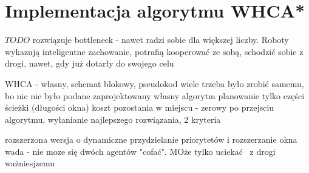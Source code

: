 \section{Implementacja algorytmu WHCA*}
\label{ch:alg-whca}

$TODO$ rozwiązuje bottleneck - nawet radzi sobie dla większej liczby.
Roboty wykazują inteligentne zachowanie, potrafią kooperować ze sobą, schodzić sobie z drogi, nawet, gdy już dotarły do swojego celu

WHCA - własny, schemat blokowy, pseudokod
wiele trzeba było zrobić samemu, bo nic nie było podane
zaprojektowany własny algorytm
planowanie tylko części ścieżki (długości okna)
koszt pozostania w miejscu - zerowy
po przejsciu algorytmu, wyłanianie najlepszego rozwiązania, 2 kryteria

rozszerzona wersja o dynamiczne przydzielanie priorytetów i rozszerzanie okna
wada - nie moze się dwóch agentów "cofać". MOże tylko uciekać  z drogi ważniesjzemu